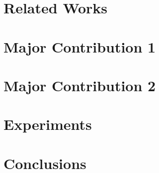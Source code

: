 \documentclass{article}
\begin{document}
  \chapter{Related Works}\label{c:Related-Works}

  
  \chapter{Major Contribution 1}\label{c:Contribution-1}

  
  \chapter{Major Contribution 2}\label{c:Contribution-2}


  \chapter{Experiments}\label{c:Experiments}

  
  \chapter{Conclusions}\label{c:Conclusions}

  
  
  
  
  \singlespacing

  
  
  \pagestyle{empty}
  \onehalfspacing
\end{document}
